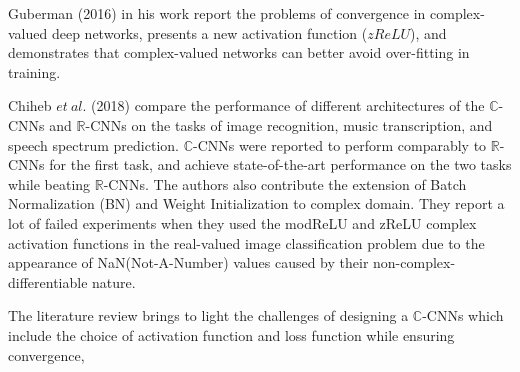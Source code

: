 Guberman (2016) \cite{Guberman} in his work report the problems of convergence in complex-valued deep networks, presents a new activation function ($zReLU$), and demonstrates that complex-valued networks can better avoid over-fitting in training. 

Chiheb $et \ al.$ (2018) \cite{trabelsi2018deep} compare the performance of different architectures of the $\mathbb{C}$-CNNs and $\mathbb{R}$-CNNs on the tasks of image recognition, music transcription, and speech spectrum prediction. $\mathbb{C}$-CNNs were reported to perform comparably to $\mathbb{R}$-CNNs for the first task, and achieve state-of-the-art performance on the two tasks while beating $\mathbb{R}$-CNNs. The authors also contribute the extension of Batch Normalization (BN) and Weight Initialization to complex domain. They report a lot of failed experiments when they used the modReLU and zReLU complex activation functions in the real-valued image classification problem due to the appearance of NaN(Not-A-Number) values caused by their non-complex-differentiable nature. 




The literature review brings to light the challenges of designing a $\mathbb{C}$-CNNs which include the choice of activation function and loss function while ensuring convergence, 





  